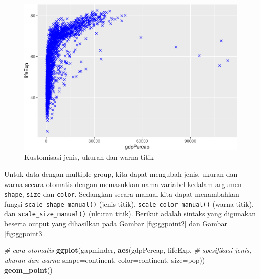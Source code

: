 \documentclass[]{book}
\newenvironment{Shaded}{\begin{snugshade}}{\end{snugshade}}
\newcommand{\KeywordTok}[1]{\textcolor[rgb]{0.13,0.29,0.53}{\textbf{#1}}}
\newcommand{\DataTypeTok}[1]{\textcolor[rgb]{0.13,0.29,0.53}{#1}}
\newcommand{\StringTok}[1]{\textcolor[rgb]{0.31,0.60,0.02}{#1}}
\newcommand{\CommentTok}[1]{\textcolor[rgb]{0.56,0.35,0.01}{\textit{#1}}}
\newcommand{\OperatorTok}[1]{\textcolor[rgb]{0.81,0.36,0.00}{\textbf{#1}}}
\newcommand{\NormalTok}[1]{#1}
\begin{document}
\begin{figure}

{\centering \includegraphics[width=0.7\linewidth]{EnvStat_files/figure-latex/ggpoint-1} 

}

\caption{Kustomisasi jenis, ukuran dan warna titik}\label{fig:ggpoint}
\end{figure}

Untuk data dengan multiple group, kita dapat mengubah jenis, ukuran dan
warna secara otomatis dengan memasukkan nama variabel kedalam argumen
\texttt{shape}, \texttt{size} dan \texttt{color}. Sedangkan secara
manual kita dapat menambahkan fungsi \texttt{scale\_shape\_manual()}
(jenis titik), \texttt{scale\_color\_manual()} (warna titik), dan
\texttt{scale\_size\_manual()} (ukuran titik). Berikut adalah sintaks
yang digunakan beserta output yang dihasilkan pada Gambar
\ref{fig:ggpoint2} dan Gambar \ref{fig:ggpoint3}.

\begin{Shaded}
\begin{Highlighting}[]
\CommentTok{# cara otomatis}
\KeywordTok{ggplot}\NormalTok{(gapminder, }\KeywordTok{aes}\NormalTok{(gdpPercap, lifeExp,}
                      \CommentTok{# spesifikasi jenis, ukuran dan warna}
                      \DataTypeTok{shape=}\NormalTok{continent, }\DataTypeTok{color=}\NormalTok{continent,}
                      \DataTypeTok{size=}\NormalTok{pop))}\OperatorTok{+}
\StringTok{  }\KeywordTok{geom_point}\NormalTok{()}
\end{Highlighting}
\end{Shaded}
\end{document}
